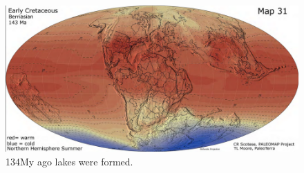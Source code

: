 \documentclass[aspectratio=169]{beamer} %
\begin{document}
{
{
\begin{frame}
	\vspace{1cm}
	\begin{figure}
	\includegraphics[scale=0.3]{images/aptianoT.png}
		\caption{134My ago lakes were formed. \citep{Scotese2013} }
	\end{figure}
\end{frame}
}
}
\end{document}
